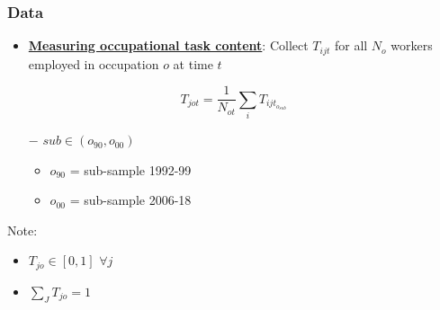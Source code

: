 \documentclass[10pt]{beamer}
\begin{document}
\begin{frame} 
	\frametitle{Data}
	
	
	\begin{itemize}
		\item \textbf{\underline{Measuring occupational task content}}:  Collect $T_{ijt}$ for all $N_{o}$ workers employed in occupation $o$ at time $t$
	\end{itemize}
	
	\begin{equation} \label{task_def_occ}
	T_{jot} = \frac{1}{N_{ot}} \sum_{i} T_{ijt_{o_{sub}}} 
	\end{equation} 
	
	
	\begin{itemize}
		\item [$-$]  $sub \in ({o_{90}, o_{00}})$ \\
		\begin{itemize}
			\item  $o_{90}$ = sub-sample 1992-99 \\
			\item  $o_{00}$ = sub-sample 2006-18 \\
		\end{itemize}
	\end{itemize}
	
	\bigskip
	
	Note:
	\begin{itemize}
		\item $T_{jo} \in [0,1]$ $\forall j$\\
		\item $\sum_{J} T_{jo} = 1$\\
	\end{itemize}
	
	
\end{frame}
\end{document}
